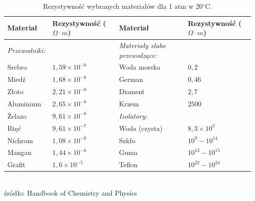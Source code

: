 \begin{table}[H]
    \centering
    \caption{Rezystywność wybranych materiałów dla 1 atm w 20$^\circ$C.}
    \begin{tabular}{llll}
        \toprule
        \textbf{Materiał} & \textbf{Rezystywność ($\Omega \cdot m$)} & \textbf{Materiał} & \textbf{Rezystywność ($\Omega \cdot m$)} \\
    \midrule
        \textit{Przewodniki:} & & \textit{Materiały słabo przewodzące:} & \\
        Srebro & $1,59 \times 10^{-8}$ & Woda morska & $0,2$ \\
        Miedź & $1,68 \times 10^{-8}$ & German & $0,46$ \\
        Złoto & $2,21 \times 10^{-8}$ & Diament & $2,7$ \\
        Aluminium & $2,65 \times 10^{-8}$ & Krzem & $2500$ \\
        Żelazo & $9,61 \times 10^{-8}$ & \textit{Izolatory:} & \\
        Rtęć & $9,61 \times 10^{-7}$ & Woda (czysta) & $8,3 \times 10^3$ \\
        Nichrom & $1,08 \times 10^{-6}$ & Szkło & $10^9 - 10^{14}$ \\
        Mangan & $1,44 \times 10^{-6}$ & Guma & $10^{13} - 10^{15}$ \\
        Grafit & $1,6 \times 10^{-5}$ & Teflon & $10^{22} - 10^{24}$ \\
    \bottomrule
    \end{tabular}
    \vspace{0.2cm} \\
    \hfill\small źródło: Handbook of Chemistry and Physics \cite{haynes2010crc} 
\end{table}
